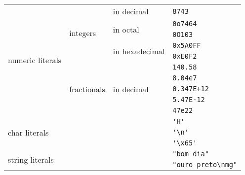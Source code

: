\begin{tabular}{|l|l|l|l|}\hline
    \multirow{10}{*}{numeric literals} & \multirow{5}{*}{integers} & in decimal & \verb|8743| \\ \cline{3-4}
    & & \multirow{2}{*}{in octal} & \verb|0o7464| \\ \cline{4-4}
    & & & \verb|0O103| \\ \cline{3-4}
    & & \multirow{2}{*}{in hexadecimal} & \verb|0x5A0FF| \\ \cline{4-4}
    & & & \verb|0xE0F2| \\ \cline{2-4}
    & \multirow{5}{*}{fractionals} & \multirow{5}{*}{in decimal} & \verb|140.58| \\ \cline{4-4}
    & & & \verb|8.04e7| \\ \cline{4-4}
    & & & \verb|0.347E+12| \\ \cline{4-4}
    & & & \verb|5.47E-12| \\ \cline{4-4}
    & & & \verb|47e22| \\ \cline{1-4}
    \multicolumn{3}{|l|}{\multirow{3}{*}{char literals}} & \verb|'H'| \\ \cline{4-4}
    \multicolumn{3}{|l|}{} & \verb|'\n'| \\ \cline{4-4}          %
    \multicolumn{3}{|l|}{} & \verb|'\x65'| \\ \cline{1-4}        %
    \multicolumn{3}{|l|}{\multirow{2}{*}{string literals}} & \verb|"bom dia"| \\ \cline{4-4}
    \multicolumn{3}{|l|}{} & \verb|"ouro preto\nmg"| \\ \cline{1-4}          %
  \end{tabular}